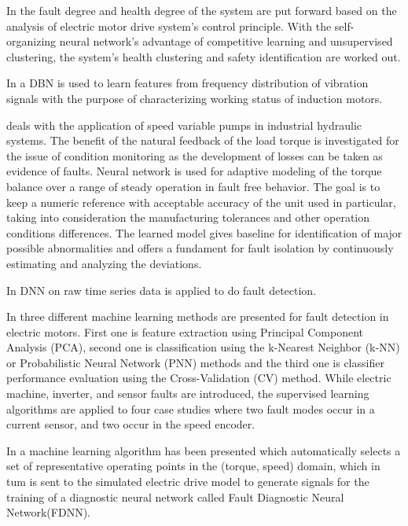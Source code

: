 \documentclass[conference]{IEEEtran}
\begin{document}
In \cite{meng2016safety} the fault degree and health degree of the system are put forward based on the analysis of electric motor drive system’s control principle. With the self-organizing neural network’s advantage of competitive learning and unsupervised clustering, the system’s health clustering and safety identification are worked out.

In \cite{Shao2017} a DBN is used to learn features from frequency distribution of vibration signals with the purpose of characterizing working status of induction motors.

\cite{alicmotor} deals with the application of speed variable pumps in industrial hydraulic systems. The benefit of the natural feedback of the load torque is investigated for the issue of condition monitoring as the development of losses can be taken as evidence of faults. Neural network is used for adaptive modeling of the torque balance over a range of steady operation in fault free behavior. The goal is to keep a numeric reference with acceptable accuracy of the unit used in particular, taking into consideration the manufacturing tolerances and other operation conditions differences. The learned model gives baseline for identification of major possible abnormalities and offers a fundament for fault isolation by continuously estimating and analyzing the deviations.

In \cite{zhang2017fault} DNN on raw time series data is applied to do fault detection.

In \cite{silva2013fault} three different machine learning methods are presented for fault detection in electric motors. First one is feature extraction using Principal Component Analysis (PCA), second one is classification using the k-Nearest Neighbor (k-NN) or Probabilistic Neural Network (PNN) methods and the third one is classifier performance evaluation using the Cross-Validation (CV) method. While electric machine, inverter, and sensor faults are introduced, the supervised learning algorithms are applied to four case studies where two fault modes occur in a current sensor, and two occur in the speed encoder.

In \cite{murphey2006fault, murphey2006model} a machine learning algorithm has been presented which automatically selects a set of representative operating points in the (torque, speed) domain, which in tum is sent to the simulated electric drive model to generate signals for the training of a diagnostic neural network called Fault Diagnostic Neural Network(FDNN).
\end{document}
